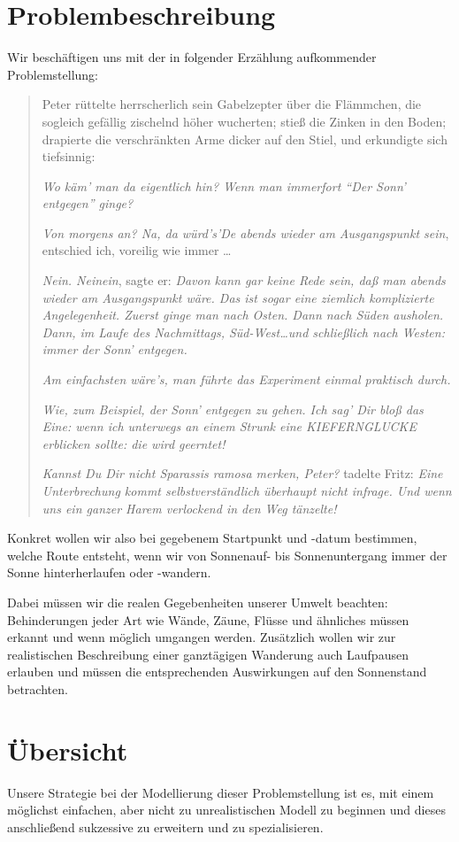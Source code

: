\documentclass[
    paper=a4,
    DIV14,
    fontsize=12pt,
    pagesize=pdftex,
    toc=bibliographynumbered
]{scrartcl}
\numberwithin{figure}{section}
\numberwithin{equation}{section}
\numberwithin{table}{section}
\begin{document}
\section{Problembeschreibung}
Wir beschäftigen uns mit der in folgender Erzählung aufkommender Problemstellung:
\blockquote{
    Peter rüttelte herrscherlich sein Gabelzepter über die Flämmchen, die sogleich gefällig
    zischelnd höher wucherten; stieß die Zinken in den Boden; drapierte die verschränkten
    Arme dicker auf den Stiel, und erkundigte sich tiefsinnig:

    \textit{Wo käm' man da eigentlich hin? Wenn man immerfort \enquote{Der Sonn' entgegen}
    ginge?}

    \textit{Von morgens an? Na, da würd's'De abends wieder am Ausgangspunkt sein},
    entschied ich, voreilig wie immer \dots

    \textit{Nein. Neinein}, sagte er: \textit{Davon kann gar keine Rede sein, daß man
    abends wieder am Ausgangspunkt wäre. Das ist sogar eine ziemlich komplizierte
    Angelegenheit. Zuerst ginge man nach Osten. Dann nach Süden ausholen. Dann, im Laufe
    des Nachmittags, Süd-West…und schließlich nach Westen: immer der Sonn' entgegen.}

    \textit{Am einfachsten wäre's, man führte das Experiment einmal praktisch durch.}

    \textit{Wie, zum Beispiel, der Sonn' entgegen zu gehen. Ich sag' Dir bloß das Eine:
    wenn ich unterwegs an einem Strunk eine KIEFERNGLUCKE erblicken sollte: die wird
    geerntet!}

    \textit{Kannst Du Dir nicht Sparassis ramosa merken, Peter?} tadelte Fritz:
    \textit{Eine Unterbrechung kommt selbstverständlich überhaupt nicht infrage. Und wenn
    uns ein ganzer Harem verlockend in den Weg tänzelte!}
}
Konkret wollen wir also bei gegebenem Startpunkt und -datum bestimmen, welche Route
entsteht, wenn wir von Sonnenauf- bis Sonnenuntergang immer der Sonne  hinterherlaufen
oder -wandern.

Dabei müssen wir die realen Gegebenheiten unserer Umwelt beachten:
Behinderungen jeder Art wie Wände, Zäune, Flüsse und ähnliches müssen erkannt und wenn
möglich umgangen werden.
Zusätzlich wollen wir zur realistischen Beschreibung einer ganztägigen Wanderung auch
Laufpausen erlauben und müssen die entsprechenden Auswirkungen auf den Sonnenstand
betrachten.

\section{Übersicht}
Unsere Strategie bei der Modellierung dieser Problemstellung ist es, mit einem möglichst
einfachen, aber nicht zu unrealistischen Modell zu beginnen und dieses anschließend
sukzessive zu erweitern und zu spezialisieren.
\end{document}
